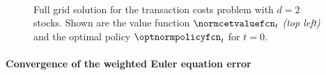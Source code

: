 \begin{figure}
  \hfill%
  \hfill%
  \\[0mm]%
  \hfill%
  \hfill%
  \caption[Reference solution for the two-dimensional TCP]{%
    Full grid solution for the transaction costs problem
    with $d = 2$ stocks.
    Shown are the value function $\normcetvaluefcn_t$ \emph{(top left)} and the
    optimal policy $\optnormpolicyfcn_t$ for $t = 0$.%
  }%
  \label{fig:financeSolution2DReference}%
\end{figure}

\paragraph{Convergence of the weighted Euler equation error}

